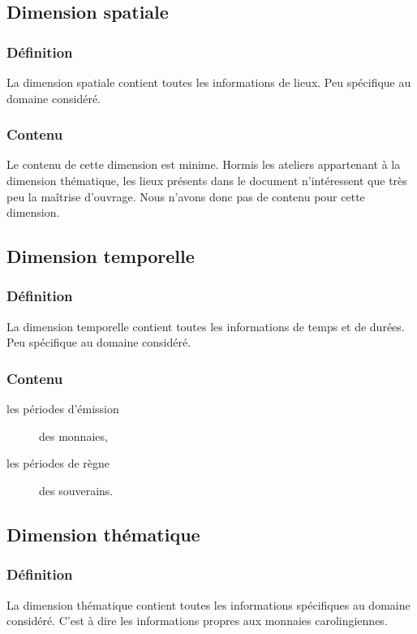 \documentclass[a4paper, 11pt]{report}
\begin{document}
    \subsection{Dimension spatiale}
    \subsubsection{Définition}
     La dimension spatiale contient toutes les informations de lieux. Peu spécifique au domaine considéré.
    \subsubsection{Contenu}
       Le contenu de cette dimension est minime. Hormis les ateliers appartenant à la dimension thématique, les lieux présents dans le document n'intéressent que très peu la maîtrise d'ouvrage. Nous n'avons donc pas de contenu pour cette dimension.
    \subsection{Dimension temporelle}
        \subsubsection{Définition}
    La dimension temporelle contient toutes les informations de temps et de durées. Peu spécifique au domaine considéré.\\
    \subsubsection{Contenu}
    \begin{description}
    \item[les périodes d'émission] des monnaies,
    \item[les périodes de règne] des souverains.
    \end{description}
    
    \subsection{Dimension thématique}
        \subsubsection{Définition}
    La dimension thématique contient toutes les informations spécifiques au domaine considéré.  C'est à dire les informations propres aux monnaies carolingiennes.
\end{document}
